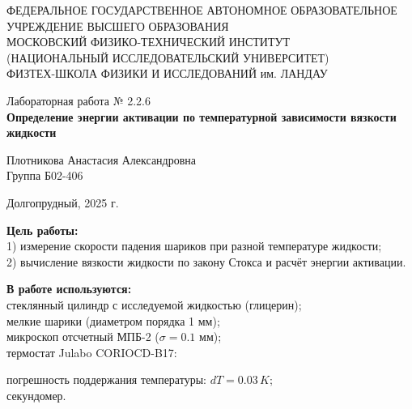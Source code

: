 \documentclass[a4paper,12pt]{article} %
\begin{document}
\begin{center}
	\footnotesize{ФЕДЕРАЛЬНОЕ ГОСУДАРСТВЕННОЕ АВТОНОМНОЕ ОБРАЗОВАТЕЛЬНОЕ 			УЧРЕЖДЕНИЕ ВЫСШЕГО ОБРАЗОВАНИЯ}\\
	\footnotesize{МОСКОВСКИЙ ФИЗИКО-ТЕХНИЧЕСКИЙ ИНСТИТУТ\\(НАЦИОНАЛЬНЫЙ 			ИССЛЕДОВАТЕЛЬСКИЙ УНИВЕРСИТЕТ)}\\
	\footnotesize{ФИЗТЕХ-ШКОЛА ФИЗИКИ И ИССЛЕДОВАНИЙ им. ЛАНДАУ\\}
	\hfill \break
	\hfill \break
	\hfill \break
	\hfill \break
\end{center}

\begin{center}   
    \hfill \break
	\hfill \break
	\hfill \break
	\hfill \break    \hfill \break
	\hfill \break
	\hfill \break
	\hfill \break
    \hfill \break
    \hfill \break
	\hfill \break
	\large{Лабораторная работа № 2.2.6 \\\textbf{Определение энергии активации
	по температурной зависимости вязкости жидкости}}\\
	\begin{flushright}
		Плотникова Анастасия Александровна\\
		Группа Б02-406
	\end{flushright}
	\hfill \break
	\hfill \break
	\hfill \break
\end{center}
\hfill \break
\hfill \break
\hfill \break
\hfill \break
\hfill \break
\hfill \break
\hfill \break
\hfill \break
\hfill \break
\hfill \break
\hfill \break
\hfill \break
\hfill \break
\begin{center}
	Долгопрудный, 2025 г.
\end{center}
\thispagestyle{empty}
\newpage
	\textbf{Цель работы:}\\ 
	1) измерение скорости падения шариков при разной температуре жидкости; \\
	2) вычисление вязкости жидкости по закону Стокса и расчёт энергии активации. \\
	\hfill \break
	
	\textbf{В работе используются:}\\ 
	стеклянный цилиндр с исследуемой жидкостью (глицерин); \\
	мелкие шарики (диаметром порядка 1 мм); \\
	микроскоп отсчетный МПБ-2 ($\sigma = 0.1$ мм); \\
	термостат Julabo CORIOCD-B17: 	\par
	погрешность поддержания температуры: $dT = 0.03 \, K$; \\
	секундомер. \\
\end{document}

